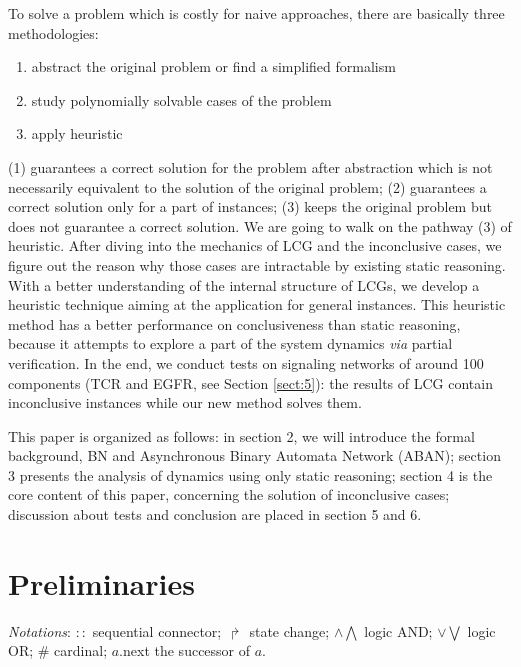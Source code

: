 \documentclass[runningheads]{llncs}
\begin{document}
To solve a problem which is costly for naive approaches, there are basically three methodologies: 
\begin{enumerate}
\renewcommand{\labelenumi}{(\theenumi)}
\item abstract the original problem or find a simplified formalism
\item study polynomially solvable cases of the problem
\item apply heuristic
\end{enumerate}
(1) guarantees a correct solution for the problem after abstraction which is not necessarily equivalent to the solution of the original problem; (2) guarantees a correct solution only for a part of instances; (3) keeps the original problem but does not guarantee a correct solution. We are going to walk on the pathway (3) of heuristic. After diving into the mechanics of LCG and the inconclusive cases, we figure out the reason why those cases are intractable by existing static reasoning. With a better understanding of the internal structure of LCGs, we develop a heuristic technique aiming at the application for general instances. This heuristic method has a better performance on conclusiveness than static reasoning, because it attempts to explore a part of the system dynamics \textit{via} partial verification. In the end, we conduct tests on signaling networks of around 100 components (TCR and EGFR, see Section \ref{sect:5}): the results of LCG contain inconclusive instances \cite{folschette2015} while our new method solves them.

This paper is organized as follows: in section 2, we will introduce the formal background, BN and Asynchronous Binary Automata Network (ABAN); section 3 presents the analysis of dynamics using only static reasoning; 
section 4 is the core content of this paper, concerning the solution of inconclusive cases; discussion about tests and conclusion are placed in section 5 and 6.

\section{Preliminaries}\label{sect:2}
\textit{Notations}:
$::$ sequential connector;
$\Rsh$ state change;
$\land \bigwedge$ logic AND;
$\lor\bigvee$ logic OR;
$\#$ cardinal;
$a.$next the successor of $a$. 
\end{document}
